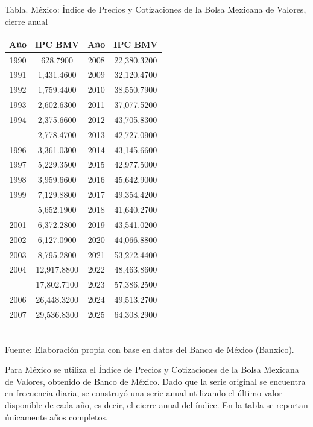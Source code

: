 \documentclass{article}\usepackage[]{graphicx}\usepackage[]{xcolor}
\begin{document}
\begin{center}
Tabla. México: Índice de Precios y Cotizaciones de la Bolsa Mexicana de Valores, cierre anual
\end{center}
\begin{center}

\begin{tabular}{cccc}
\toprule
Año & IPC BMV & Año & IPC BMV\\
\midrule
1990 & 628.7900 & 2008 & 22,380.3200\\
1991 & 1,431.4600 & 2009 & 32,120.4700\\
1992 & 1,759.4400 & 2010 & 38,550.7900\\
1993 & 2,602.6300 & 2011 & 37,077.5200\\
1994 & 2,375.6600 & 2012 & 43,705.8300\\
\addlinespace
1995 & 2,778.4700 & 2013 & 42,727.0900\\
1996 & 3,361.0300 & 2014 & 43,145.6600\\
1997 & 5,229.3500 & 2015 & 42,977.5000\\
1998 & 3,959.6600 & 2016 & 45,642.9000\\
1999 & 7,129.8800 & 2017 & 49,354.4200\\
\addlinespace
2000 & 5,652.1900 & 2018 & 41,640.2700\\
2001 & 6,372.2800 & 2019 & 43,541.0200\\
2002 & 6,127.0900 & 2020 & 44,066.8800\\
2003 & 8,795.2800 & 2021 & 53,272.4400\\
2004 & 12,917.8800 & 2022 & 48,463.8600\\
\addlinespace
2005 & 17,802.7100 & 2023 & 57,386.2500\\
2006 & 26,448.3200 & 2024 & 49,513.2700\\
2007 & 29,536.8300 & 2025 & 64,308.2900\\
\bottomrule
\end{tabular}
\\[0.3em]
{\footnotesize Fuente: Elaboración propia con base en datos del Banco de México (Banxico).}
\end{center}


Para México se utiliza el Índice de Precios y Cotizaciones de la Bolsa Mexicana de Valores, obtenido de Banco de México. Dado que la serie original se encuentra en frecuencia diaria, se construyó una serie anual utilizando el último valor disponible de cada año, es decir, el cierre anual del índice. En la tabla se reportan únicamente años completos.
\end{document}
